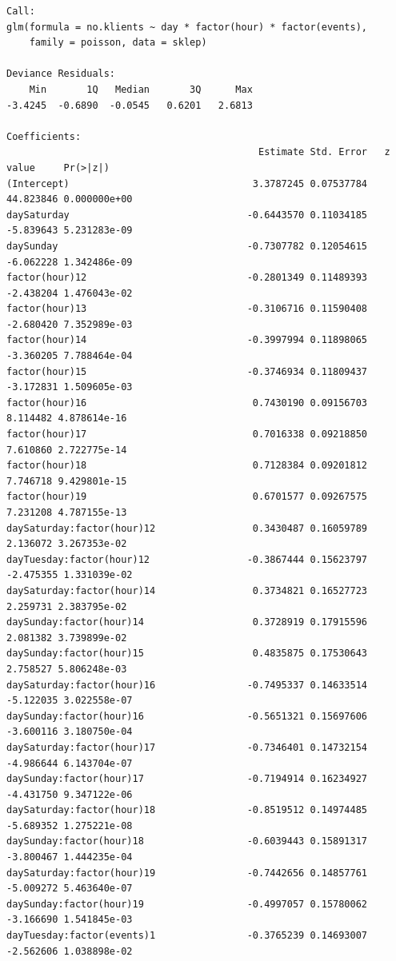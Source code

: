 \documentclass[a4paper,11pt]{article}
\begin{document}
\begin{verbatim}
Call:
glm(formula = no.klients ~ day * factor(hour) * factor(events), 
    family = poisson, data = sklep)

Deviance Residuals: 
    Min       1Q   Median       3Q      Max  
-3.4245  -0.6890  -0.0545   0.6201   2.6813  

Coefficients:
                                            Estimate Std. Error   z value     Pr(>|z|)
(Intercept)                                3.3787245 0.07537784 44.823846 0.000000e+00
daySaturday                               -0.6443570 0.11034185 -5.839643 5.231283e-09
daySunday                                 -0.7307782 0.12054615 -6.062228 1.342486e-09
factor(hour)12                            -0.2801349 0.11489393 -2.438204 1.476043e-02
factor(hour)13                            -0.3106716 0.11590408 -2.680420 7.352989e-03
factor(hour)14                            -0.3997994 0.11898065 -3.360205 7.788464e-04
factor(hour)15                            -0.3746934 0.11809437 -3.172831 1.509605e-03
factor(hour)16                             0.7430190 0.09156703  8.114482 4.878614e-16
factor(hour)17                             0.7016338 0.09218850  7.610860 2.722775e-14
factor(hour)18                             0.7128384 0.09201812  7.746718 9.429801e-15
factor(hour)19                             0.6701577 0.09267575  7.231208 4.787155e-13
daySaturday:factor(hour)12                 0.3430487 0.16059789  2.136072 3.267353e-02
dayTuesday:factor(hour)12                 -0.3867444 0.15623797 -2.475355 1.331039e-02
daySaturday:factor(hour)14                 0.3734821 0.16527723  2.259731 2.383795e-02
daySunday:factor(hour)14                   0.3728919 0.17915596  2.081382 3.739899e-02
daySunday:factor(hour)15                   0.4835875 0.17530643  2.758527 5.806248e-03
daySaturday:factor(hour)16                -0.7495337 0.14633514 -5.122035 3.022558e-07
daySunday:factor(hour)16                  -0.5651321 0.15697606 -3.600116 3.180750e-04
daySaturday:factor(hour)17                -0.7346401 0.14732154 -4.986644 6.143704e-07
daySunday:factor(hour)17                  -0.7194914 0.16234927 -4.431750 9.347122e-06
daySaturday:factor(hour)18                -0.8519512 0.14974485 -5.689352 1.275221e-08
daySunday:factor(hour)18                  -0.6039443 0.15891317 -3.800467 1.444235e-04
daySaturday:factor(hour)19                -0.7442656 0.14857761 -5.009272 5.463640e-07
daySunday:factor(hour)19                  -0.4997057 0.15780062 -3.166690 1.541845e-03
dayTuesday:factor(events)1                -0.3765239 0.14693007 -2.562606 1.038898e-02

\end{verbatim}
\end{document}
